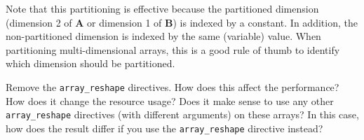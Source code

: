 

\begin{aside}
Note that this partitioning is effective because the partitioned dimension (dimension 2 of $\mathbf{A}$ or dimension 1 of $\mathbf{B}$) is indexed by a constant.   In addition, the non-partitioned dimension is indexed by the same (variable) value.  When partitioning multi-dimensional arrays, this is a good rule of thumb to identify which dimension should be partitioned.
\end{aside}

\begin{exercise}
Remove the \lstinline{array_reshape} directives. How does this affect the performance? How does it change the resource usage? Does it make sense to use any other \lstinline{array_reshape} directives (with different arguments) on these arrays?  In this case, how does the result differ if you use the \lstinline{array_reshape} directive instead?
\end{exercise}


